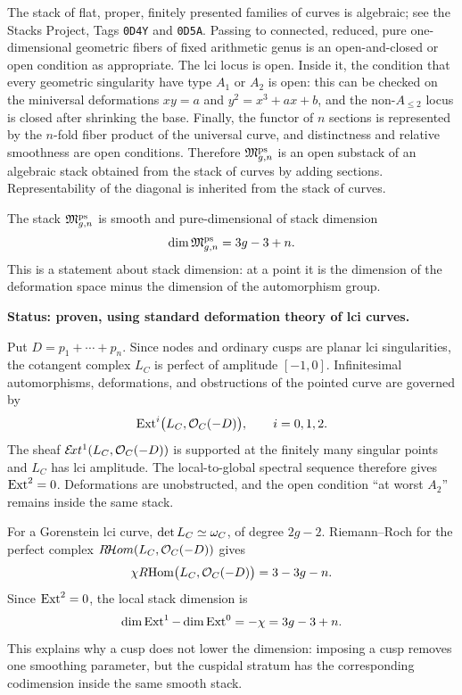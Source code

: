 \documentclass[12pt]{memoir}
\begin{document}
\begin{ptcbp}
    The stack of flat, proper, finitely presented families of curves is
    algebraic; see the Stacks Project, Tags \texttt{0D4Y} and \texttt{0D5A}.
    Passing to connected, reduced, pure one-dimensional geometric fibers of
    fixed arithmetic genus is an open-and-closed or open condition as
    appropriate.  The lci locus is open.  Inside it, the condition that every
    geometric singularity have type \(A_1\) or \(A_2\) is open: this can be
    checked on the miniversal deformations
    \(xy=a\) and \(y^2=x^3+ax+b\), and the non-\(A_{\leq2}\) locus is closed
    after shrinking the base.  Finally, the functor of \(n\) sections is
    represented by the \(n\)-fold fiber product of the universal curve, and
    distinctness and relative smoothness are open conditions.  Therefore
    \(\mathfrak M^{\operatorname{\mathrm{ps}}}_{g,n}\) is an open substack of an algebraic stack
    obtained from the stack of curves by adding sections.  Representability
    of the diagonal is inherited from the stack of curves.
\end{ptcbp}

\begin{Prop}
    \label{prop-pre-ps-smooth-dimension}
    The stack \(\mathfrak M^{\operatorname{\mathrm{ps}}}_{g,n}\) is smooth and pure-dimensional of
    stack dimension
    \[
        \dim\mathfrak M^{\operatorname{\mathrm{ps}}}_{g,n}=3g-3+n.
    \]
    This is a statement about stack dimension: at a point it is the dimension
    of the deformation space minus the dimension of the automorphism group.

    \noindent\textbf{Status: proven, using standard deformation theory of
    lci curves.}
\end{Prop}

\begin{ptcbp}
    Put \(D=p_1+\cdots+p_n\).  Since nodes and ordinary cusps are planar lci
    singularities, the cotangent complex \(L_C\) is perfect of amplitude
    \([-1,0]\).  Infinitesimal automorphisms, deformations, and obstructions
    of the pointed curve are governed by
    \[
        \operatorname{Ext}^i\bigl(L_C,\mathcal{O}_C(-D)\bigr),\qquad i=0,1,2.
    \]
    The sheaf \(\mathcal{E}\!xt^1(L_C,\mathcal{O}_C(-D))\) is supported at the finitely many
    singular points and \(L_C\) has lci amplitude.  The local-to-global
    spectral sequence therefore gives \(\operatorname{Ext}^2=0\).  Deformations are
    unobstructed, and the open condition ``at worst \(A_2\)'' remains inside
    the same stack.

    For a Gorenstein lci curve,
    \(\det L_C\simeq\omega_C\), of degree \(2g-2\).  Riemann--Roch for the
    perfect complex \(R\!\mathcal{H} om(L_C,\mathcal{O}_C(-D))\) gives
    \[
        \chi R\!\operatorname{Hom}\bigl(L_C,\mathcal{O}_C(-D)\bigr)=3-3g-n.
    \]
    Since \(\operatorname{Ext}^2=0\), the local stack dimension is
    \[
        \dim\operatorname{Ext}^1-\dim\operatorname{Ext}^0
        =-\chi=3g-3+n.
    \]
    This explains why a cusp does not lower the dimension: imposing a cusp
    removes one smoothing parameter, but the cuspidal stratum has the
    corresponding codimension inside the same smooth stack.
\end{ptcbp}
\end{document}
